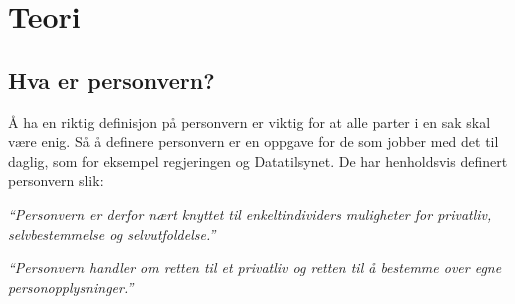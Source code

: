 \section{Teori}

\subsection{Hva er personvern?}
Å ha en riktig definisjon på personvern er viktig for at alle parter i en sak skal være enig. Så å definere personvern er en oppgave for de som jobber med det til daglig, som for eksempel regjeringen og Datatilsynet. De har henholdsvis definert personvern slik:

\textit{``Personvern er derfor nært knyttet til enkeltindividers muligheter for privatliv, selvbestemmelse og selvutfoldelse.''} \parencite{artikkel:regjeringen_personvern}

\textit{``Personvern handler om retten til et privatliv og retten til å bestemme over egne personopplysninger.''} \parencite{artikkel:datatilsynet_personvern}


\parencite{artikkel:regjeringen_nylov}\\

\newpage